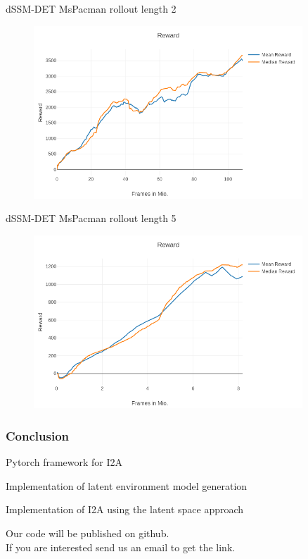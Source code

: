 \begin{frame}{dSSM-DET MsPacman rollout length 2}
	\vspace{-10mm}
    \begin{figure}
        \centering
        \includegraphics[width=0.9\textwidth]{./latent_i2a_images/dSSM_DET_MsPacman_100mio.png}
    \end{figure}
\end{frame}

\begin{frame}{dSSM-DET MsPacman rollout length 5}
	\vspace{-10mm}
    \begin{figure}
        \centering
        \includegraphics[width=0.9\textwidth]{./latent_i2a_images/MsPacman_dSSM_DET_5rollout.png}
    \end{figure}
\end{frame}


\begin{frame}
	\frametitle{Conclusion}
	\begin{PraesentationAufzaehlung}
		\item Pytorch framework for I2A
		\item Implementation of latent environment model generation
		\item Implementation of I2A using the latent space approach
	\end{PraesentationAufzaehlung}
	
	\bigskip
	Our code will be published on github.\\
	If you are interested send us an email to get the link.
\end{frame}


